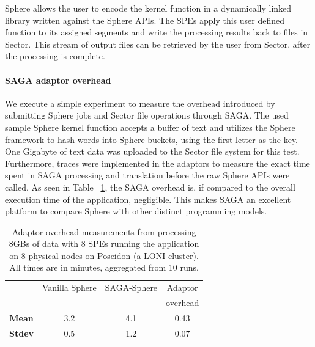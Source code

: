 \documentclass[3p,twocolumn]{elsarticle}
\begin{document}
Sphere allows the user to encode the kernel function in a dynamically
linked library written against the Sphere APIs.  The SPEs apply this
user defined function to its assigned segments and write the
processing results back to files in Sector.  This stream of output
files can be retrieved by the user from Sector, after the processing
is complete. 


\paragraph{SAGA adaptor overhead} \label{ssec:overhead}

We execute a simple experiment to measure the overhead introduced by
submitting Sphere jobs and Sector file operations through SAGA.  The
used sample Sphere kernel function accepts a buffer of text and
utilizes the Sphere framework to hash words into Sphere buckets, using
the first letter as the key. One Gigabyte of text data was uploaded to
the Sector file system for this test.  Furthermore, traces were
implemented in the adaptors to measure the exact time spent in SAGA
processing and translation before the raw Sphere APIs were called.  As
seen in Table ~\ref{tab:sphere_overhead}, the SAGA overhead is, if compared
to the overall execution time of the application, negligible.
This makes SAGA an excellent platform to compare Sphere with other distinct
programming models.

\begin{table}[h!]
  \footnotesize
  \begin{tabular}{cccc}
    \hline
    & Vanilla Sphere &  SAGA-Sphere & Adaptor \\
    &                &              & overhead \\
    \hline
    { {\bf Mean}} & 3.2    & 4.1    & 0.43  \\
    \hline 
    { {\bf Stdev}} & 0.5    & 1.2    & 0.07   \\
    \hline \hline
  \end{tabular}
  \caption{Adaptor overhead measurements from processing 8GBs of data with 8
  SPEs running the \wc application on 8 physical nodes on Poseidon (a
  LONI cluster).  All times are in minutes, aggregated from 10 runs.
  \label{tab:sphere_overhead}}
\end{table}
\end{document}
